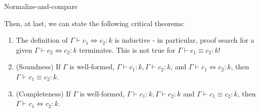 \documentclass{amsart}
\newcommand{\type}{\ensuremath{\mathtt{type}}}
\begin{document}
\begin{section}{Normalize-and-compare}

    Then, at last, we can state the following critical theorems:

        \begin{enumerate}
            \item The definition of $\Gamma \vdash c_1 \iff c_2 : k$ is inductive - in particular, proof search for a given $\Gamma \vdash c_2 \iff c_2 : k$ terminates. This is not true for $\Gamma \vdash c_1 \equiv c_2 : k$!
            \item (Soundness) If $\Gamma$ is well-formed, $\Gamma \vdash c_1 : k, \Gamma \vdash c_2 : k$, and $\Gamma \vdash c_1 \iff c_2 : k$, then $\Gamma \vdash c_1 \equiv c_2 : k$.
            \item (Completeness) If $\Gamma$ is well-formed, $\Gamma \vdash c_1 : k, \Gamma \vdash c_2 : k$ and $\Gamma \vdash c_1 \equiv c_2 : k$, then $\Gamma \vdash c_1 \iff c_2 : k$.
        \end{enumerate}
\end{section}
    
\end{document}
